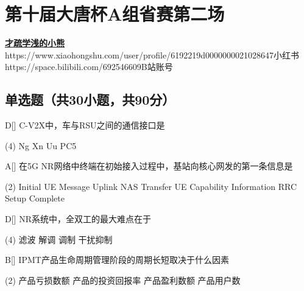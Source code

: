 \chapter{第十届大唐杯A组省赛第二场}
\fancyhead[R]{\color{H6}\kaishu\rightmark\,}

\date{2023年4月15日}{}{\href{https://qm.qq.com/q/UPbGudx8cK}{\textbf{才疏学浅的小熊}}}
{}
{https://www.xiaohongshu.com/user/profile/6192219d0000000021028647}{小红书}
{https://space.bilibili.com/692546609}{B站账号}




\section{单选题（共30小题，共90分）}



\begin{choice}{D}[]
	C-V2X中，车与RSU之间的通信接口是
	\begin{tasks}(4)
		\task Ng
		\task Xn
		\task Uu
		\task PC5
	\end{tasks}
\end{choice}


\begin{choice}{A}[]
	在5G NR网络中终端在初始接入过程中，基站向核心网发的第一条信息是
	\begin{tasks}(2)
		\task Initial UE Message
		\task Uplink NAS Transfer
		\task UE Capability Information
		\task RRC Setup Complete
	\end{tasks}
\end{choice}




\begin{choice}{D}[]
	NR系统中，全双工的最大难点在于
	\begin{tasks}(4)
		\task 滤波
		\task 解调
		\task 调制
		\task 干扰抑制
	\end{tasks}
\end{choice}


\begin{choice}{B}[]
	IPMT产品生命周期管理阶段的周期长短取决于什么因素
	\begin{tasks}(2)
		\task 产品亏损数额
		\task 产品的投资回报率
		\task 产品盈利数额
		\task 产品用户数
	\end{tasks}
\end{choice}


